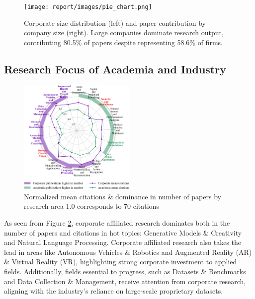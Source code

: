 \documentclass{article}
\begin{document}
\begin{figure}[ht]
  \centering
  \texttt{[image: report/images/pie\_chart.png]}  
  \caption{Corporate size distribution (left) and paper contribution by company size (right). Large companies dominate research output, contributing 80.5$\%$ of papers despite representing 58.6$\%$ of firms.}
  \label{fig:corporate_size_graph}
\end{figure}
\vspace{-10pt}
\newpage
\subsection{Research Focus of Academia and Industry}
\vspace{-7pt}

\begin{figure}
\centering
\vspace{-10pt}
\includegraphics[width=0.5\textwidth]{report/images/citation_radar_plot.png}  
\caption{Normalized mean citations \& dominance in number of papers by research area 1.0 corresponds to 70 citations}
\vspace{10pt}
\label{fig:research_focus_radar}
\end{figure}
As seen from Figure \ref{fig:research_focus_radar}, corporate affiliated research dominates both in the number of papers and citations in hot topics: Generative Models \& Creativity and Natural Language Processing. Corporate affiliated research also takes the lead in areas like Autonomous Vehicles \& Robotics and Augmented Reality (AR) \& Virtual Reality (VR), highlighting strong corporate investment to applied fields. Additionally, fields essential to progress, such as Datasets \& Benchmarks and Data Collection \& Management, receive attention from corporate research, aligning with the industry's reliance on large-scale proprietary datasets.
\end{document}
